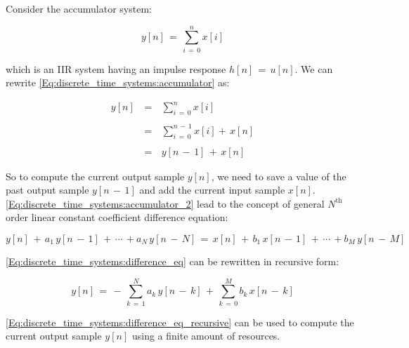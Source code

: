 \documentclass[12pt,a4paper]{book}
\begin{document}
Consider the accumulator system:

\begin{equation}
y[n] \, = \, \displaystyle\sum\limits_{i \, = \, 0}^n x[i]
\label{Eq:discrete_time_systems:accumulator}
\end{equation}

which is an IIR system having an impulse response $h[n] \, = \, u[n]$. We can rewrite \autoref{Eq:discrete_time_systems:accumulator} as:

\begin{equation}
\begin{array}{rcl}
y[n] \, &=& \, \displaystyle\sum\limits_{i \, = \, 0}^n x[i] \\ \\		
		&=& \, \displaystyle\sum\limits_{i \, = \, 0}^{n \, - \, 1} x[i] + \, x[n] \\ \\
		&=& \, y[n \, - \, 1] \, + \, x[n]
\end{array}
\label{Eq:discrete_time_systems:accumulator_2}
\end{equation}

So to compute the current output sample $y[n]$, we need to save a value of the past output sample $ y[n \, - \, 1] $ and add the current input sample $x[n]$.\\

\autoref{Eq:discrete_time_systems:accumulator_2} lead to the concept of general $N^{\text{th}}$ order linear constant coefficient difference equation:

\begin{equation}
y[n] \, + \, a_1 \, y[n \, - \, 1] \, + \, \cdots \, + a_N \, y[n \, - \, N] \, = \, x[n] \, + \, b_1 \, x[n \, - \, 1] \, + \, \cdots \, + b_M \, y[n \, - \, M]
\label{Eq:discrete_time_systems:difference_eq}	
\end{equation}

\autoref{Eq:discrete_time_systems:difference_eq} can be rewritten in recursive form:

\begin{equation}
y[n] \, = \, - \, \displaystyle\sum\limits_{k \, = \, 1}^N a_k \, y[n \, - \, k] \, + \, \displaystyle\sum\limits_{k \, = \, 0}^M b_k \, x[n \, - \, k]
\label{Eq:discrete_time_systems:difference_eq_recursive} 
\end{equation}

\autoref{Eq:discrete_time_systems:difference_eq_recursive} can be used to compute the current output sample $y[n]$ using a finite amount of resources.
\end{document}
